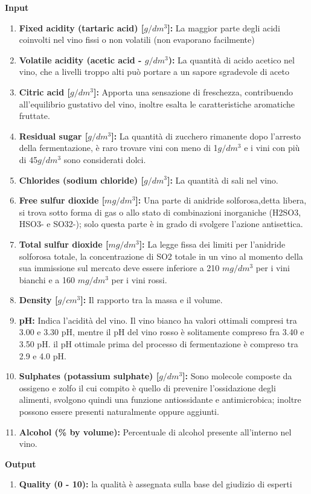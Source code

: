 \noindent
\textbf{Input}
\begin{enumerate}
    \item \textbf{Fixed acidity (tartaric acid) [$g / dm^3$]:} La maggior parte degli acidi coinvolti nel vino fissi o non volatili (non evaporano facilmente)
    \item \textbf{Volatile acidity (acetic acid - $g / dm^3$):} La quantità di acido acetico nel vino, che a livelli troppo alti può portare a un sapore sgradevole di aceto
    \item \textbf{Citric acid [$g / dm^3$]:} Apporta una sensazione di freschezza, contribuendo all'equilibrio gustativo del vino, inoltre esalta le caratteristiche aromatiche fruttate.
    \item \textbf{Residual sugar [$g / dm^3$]:} La quantità di zucchero rimanente dopo l'arresto della fermentazione, è raro trovare vini con meno di 1$g / dm^3$ e i vini con più di 45$g / dm^3$ sono considerati dolci.
    \item \textbf{Chlorides (sodium chloride)  [$g / dm^3$]:} La quantità di sali nel vino.
    \item \textbf{Free sulfur dioxide [$mg / dm^3$]:} Una parte di anidride solforosa,detta libera, si trova sotto forma di gas o allo stato di combinazioni inorganiche (H2SO3, HSO3- e SO32-); solo questa parte è in grado di svolgere l'azione antisettica.
    \item \textbf{Total sulfur dioxide [$mg / dm^3$]:} La legge fissa dei limiti per l'anidride solforosa totale, la concentrazione di SO2 totale in un vino al momento della sua immissione sul mercato deve essere inferiore a 210 $mg / dm^3$ per i vini bianchi e a 160 $mg / dm^3$ per i vini rossi.
    \item \textbf{Density [$g / cm^3$]:} Il rapporto tra la massa e il volume.
    \item \textbf{pH:} Indica l'acidità del vino. Il vino bianco ha valori ottimali compresi tra 3.00 e 3.30 pH, mentre il pH del vino rosso è solitamente compreso fra 3.40 e 3.50 pH. il pH ottimale prima del processo di fermentazione è compreso tra 2.9 e 4.0 pH.
    \item \textbf{Sulphates (potassium sulphate) [$g / dm^3$]:} Sono molecole composte da ossigeno e zolfo il cui compito è quello di prevenire l'ossidazione degli alimenti, svolgono quindi una funzione antiossidante e antimicrobica; inoltre possono essere presenti naturalmente oppure aggiunti.
    \item \textbf{Alcohol (\% by volume):} Percentuale di alcohol presente all'interno nel vino.
\end{enumerate}

\noindent
\textbf{Output}
\begin{enumerate}
    \addtocounter{enumi}{11}
    \item \textbf{Quality (0 - 10):} la qualità è assegnata sulla base del giudizio di esperti
\end{enumerate}




